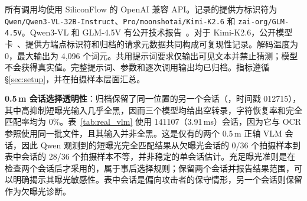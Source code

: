 \documentclass{ieeeaccess}
\begin{document}
所有调用均使用 SiliconFlow 的 OpenAI 兼容 API。记录的提供方标识符为 \texttt{Qwen/\allowbreak Qwen3-\allowbreak VL-\allowbreak 32B-\allowbreak Instruct}、\texttt{Pro/\allowbreak moonshotai/\allowbreak Kimi-\allowbreak K2.6} 和 \texttt{zai-\allowbreak org/\allowbreak GLM-\allowbreak 4.5V}。Qwen3-VL 和 GLM-4.5V 有公开技术报告~\cite{b_qwen3vl2025,b_glm45v2025}。对于 Kimi-K2.6，公开模型卡~\cite{b_kimi_k26}、提供方端点标识符和归档的请求元数据共同构成可复现性记录。解码温度为 0，最大输出为 4,096 个词元。共用提示词要求仅输出可见文本并禁止猜测；模型不会获得真实值。完整提示词、参数和逐次调用输出均已归档。指标遵循 \S\ref{sec:setup}，并在拍摄样本层面汇总。

\textbf{0.5\,m 会话选择透明性}：归档保留了同一位置的另一个会话（，时间戳 012715），其中高抑制短曝光输入几乎全黑，因而三个模型均给出空转录，字符恢复率和完全匹配率均为 0\%。表~\ref{tab:real_vlm} 使用 141107（3.91\,ms）会话，因为它与 OCR 参照使用同一批文件，且其输入并非全黑。这是仅有的两个 0.5\,m 正轴 VLM 会话，因此 Qwen 观测到的短曝光完全匹配结果从欠曝光会话的 0/36 个拍摄样本到表中会话的 28/36 个拍摄样本不等，并非稳定的单会话估计。充足曝光准则是在检查两个会话后才采用的，属于事后选择规则；保留两个会话并报告结果范围，可以明确揭示其曝光敏感性。表中会话是偏向攻击者的保守情形，另一个会话则保留作为欠曝光诊断。
\end{document}
